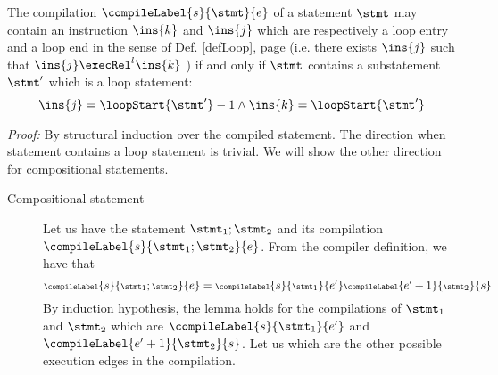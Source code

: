 \begin{compProp9A}  The compilation $\compileLabel{s}{\stmt}{e}$ of a statement $\stmt$ may contain an instruction $\ins{k}$ and $\ins{j}$  which are respectively 
a loop entry and a loop end  in the sense of Def.
\ref{defLoop}, page \pageref{defLoop}  (i.e. there exists $\ins{j}$ such that $\ins{j} \execRel^{l} \ins{k}$ ) if and only if  $\stmt$  contains 
 a substatement $\stmt'$ which is a loop statement:
 $$ \ins{j} = \loopStart{\stmt'}  - 1 \wedge  \ins{k} = \loopStart{\stmt'}  $$
\end{compProp9A}
\textit{Proof:}
By structural induction over the compiled statement. The direction when statement contains a loop statement is trivial.
We will show the other direction for compositional statements.
\begin{description}
\item[Compositional statement]
Let us have the statement $\stmt_1;\stmt_2$ and its compilation 
 $\compileLabel{s}{\stmt_1;\stmt_2}{e}$. From the compiler definition,
we have that  
$$ \scriptsize{\compileLabel{s}{\stmt_1;\stmt_2}{e} = \compileLabel{s}{\stmt_1}{e'}\compileLabel{e'+1}{\stmt_2}{s}}$$
 By induction hypothesis, the lemma holds for  the compilations of $\stmt_1$ and   $\stmt_2$ which are 
$\compileLabel{s}{\stmt_1}{e'}$ and  $\compileLabel{e'+1}{\stmt_2}{s}$.
Let us which are the other possible execution edges in the compilation.



\end{description}
